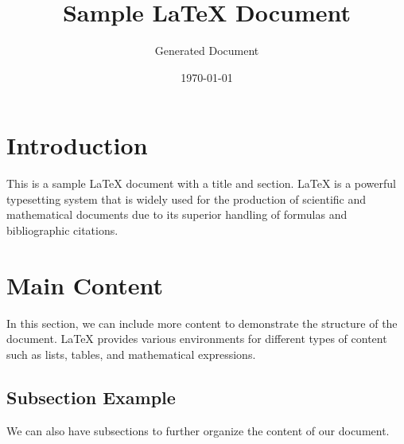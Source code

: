 \documentclass{article}
\title{Sample LaTeX Document}
\author{Generated Document}
\date{\today}
\begin{document}
\maketitle

\section{Introduction}
This is a sample LaTeX document with a title and section. LaTeX is a powerful typesetting system that is widely used for the production of scientific and mathematical documents due to its superior handling of formulas and bibliographic citations.

\section{Main Content}
In this section, we can include more content to demonstrate the structure of the document. LaTeX provides various environments for different types of content such as lists, tables, and mathematical expressions.

\subsection{Subsection Example}
We can also have subsections to further organize the content of our document.
\end{document}

